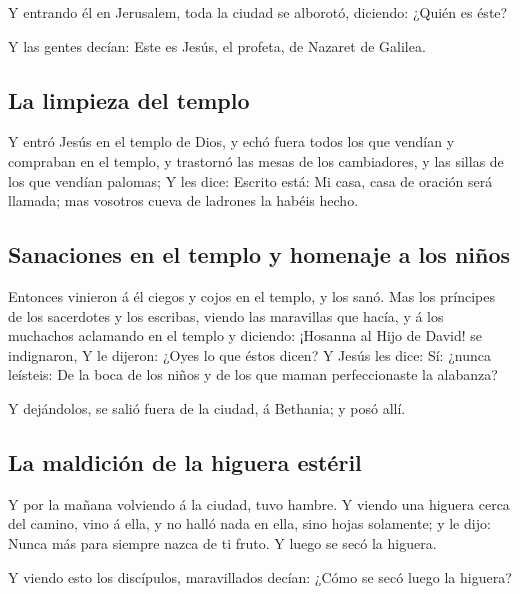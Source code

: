 Y entrando él en Jerusalem, toda la ciudad se alborotó,
diciendo: ¿Quién es éste?

 Y las gentes decían: Este es Jesús, el profeta, de Nazaret
de Galilea.

\hypertarget{la-limpieza-del-templo}{%
\subsection{La limpieza del templo}\label{la-limpieza-del-templo}}

 Y entró Jesús en el templo de Dios, y echó fuera todos los
que vendían y compraban en el templo, y trastornó las mesas de los
cambiadores, y las sillas de los que vendían palomas;  Y
les dice: Escrito está: Mi casa, casa de oración será llamada; mas
vosotros cueva de ladrones la habéis hecho.

\hypertarget{sanaciones-en-el-templo-y-homenaje-a-los-niuxf1os}{%
\subsection{Sanaciones en el templo y homenaje a los
niños}\label{sanaciones-en-el-templo-y-homenaje-a-los-niuxf1os}}

 Entonces vinieron á él ciegos y cojos en el templo, y los
sanó.  Mas los príncipes de los sacerdotes y los escribas,
viendo las maravillas que hacía, y á los muchachos aclamando en el
templo y diciendo: ¡Hosanna al Hijo de David! se indignaron,
 Y le dijeron: ¿Oyes lo que éstos dicen? Y Jesús les dice:
Sí: ¿nunca leísteis: De la boca de los niños y de los que maman
perfeccionaste la alabanza?

 Y dejándolos, se salió fuera de la ciudad, á Bethania; y
posó allí.

\hypertarget{la-maldiciuxf3n-de-la-higuera-estuxe9ril}{%
\subsection{La maldición de la higuera
estéril}\label{la-maldiciuxf3n-de-la-higuera-estuxe9ril}}

 Y por la mañana volviendo á la ciudad, tuvo hambre.
 Y viendo una higuera cerca del camino, vino á ella, y no
halló nada en ella, sino hojas solamente; y le dijo: Nunca más para
siempre nazca de ti fruto. Y luego se secó la higuera.

 Y viendo esto los discípulos, maravillados decían: ¿Cómo
se secó luego la higuera?

